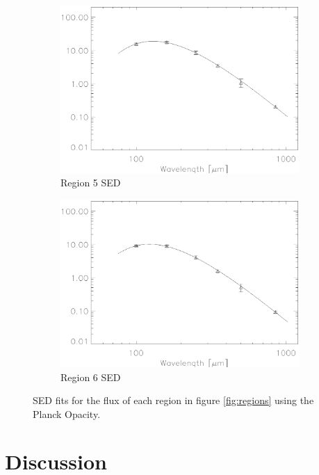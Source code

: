 \begin{figure}
  \begin{subfigure}[t]{.48\textwidth}
    \centering
    \includegraphics[width=1.\textwidth]{sed_imgs/region_5beta_20_SED_fit.eps}
    \caption{Region 5 SED}
  \end{subfigure}
  \quad
  \begin{subfigure}[t]{.48\textwidth}
    \centering
    \includegraphics[width=1.\textwidth]{sed_imgs/region_6beta_195_SED_fit.eps}
    \caption{Region 6 SED}
  \end{subfigure}
  \caption[Region Flux SED Fits]{SED fits for the flux of each region in figure \ref{fig:regions} using the Planck Opacity.}
  \label{fig:SED_region}
\end{figure}
  
  
  
\section{Discussion}

